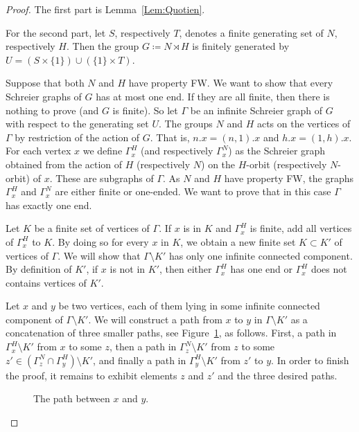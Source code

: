 \begin{proof}
The first part is Lemma~\ref{Lem:Quotien}.

For the second part, let $S$, respectively $T$, denotes a finite generating set of $N$, respectively $H$.
Then the group $G\coloneqq N\rtimes H$ is finitely generated by $U=(S\times\{1\}) \cup(\{1\}\times T)$.


Suppose that both $N$ and $H$ have property FW. We want to show that every Schreier graphs of $G$ has at most one end. If they are all finite, then there is nothing to prove (and $G$ is finite). So let $\Gamma$ be an infinite Schreier graph of $G$ with respect to the generating set $U$. The groups $N$ and $H$ acts on the vertices of $\Gamma$ by restriction of the action of $G$. That is, $n.x = (n,1).x$ and $h.x = (1,h).x$.
For each vertex $x$ we define $\Gamma_x^H$ (and respectively $\Gamma_x^N$) as the Schreier graph obtained from the action of $H$ (respectively $N$) on the $H$-orbit (respectively $N$-orbit) of $x$. These are subgraphs of $\Gamma$. As $N$ and $H$ have property FW, the graphs $\Gamma_x^H$ and $\Gamma_x^N$ are either finite or one-ended. We want to prove that in this case $\Gamma$ has exactly one end.

Let $K$ be a finite set of vertices of $\Gamma$.
If $x$ is in $K$ and $\Gamma_x^H$ is finite, add all vertices of $\Gamma_x^H$ to $K$.
By doing so for every $x$ in $K$, we obtain a new finite set $K\subset K'$ of vertices of $\Gamma$.
We will show that $\Gamma\setminus K'$ has only one infinite connected component.
By definition of $K'$, if $x$ is not in $K'$, then either $\Gamma_x^H$ has one end or $\Gamma_x^H$ does not contains vertices of $K'$.

Let $x$ and $y$ be two vertices, each of them lying in some infinite connected component of $\Gamma\setminus K'$.
We will construct a path from $x$ to $y$ in $\Gamma\setminus K'$ as a concatenation of three smaller paths, see Figure~\ref{Figure:PathSemiDirect}, as follows.
First, a path in $\Gamma_x^H\setminus K'$ from $x$ to some $z$, then a path in $\Gamma_z^N\setminus K'$ from $z$ to some $z'\in (\Gamma_z^N\cap \Gamma_y^H)\setminus K'$, and finally a path in $\Gamma_y^H\setminus K'$ from $z'$ to $y$.
In order to finish the proof, it remains to exhibit elements $z$ and $z'$ and the three desired paths.
%
%
\begin{figure}[htbp]\centering
\scalebox{01}{
}
\caption{The path between $x$ and $y$.}
\label{Figure:PathSemiDirect}
\end{figure}
%
%


\end{proof}
